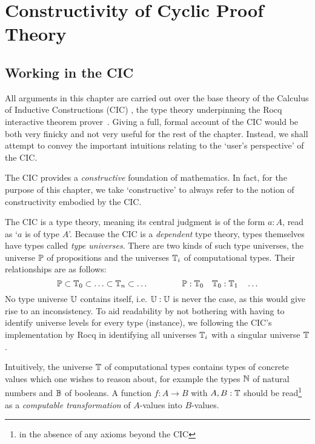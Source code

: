 
\chapter{Constructivity of Cyclic Proof Theory}
\label{chap:constructivity}

\section{Working in the CIC}
\label{sec:cic-intro}

All arguments in this chapter are carried out over the base theory of the
Calculus of Inductive Constructions (CIC) \needcite{}, the type theory
underpinning the Rocq interactive theorem prover~\needcite{}. Giving a full,
formal account of the CIC would be both very finicky and not very useful for the
rest of the chapter. Instead, we shall attempt to convey the important
intuitions relating to the `user's perspective' of the CIC.

The CIC provides a \emph{constructive} foundation of mathematics. In fact, for
the purpose of this chapter, we take `constructive' to always refer to the
notion of constructivity embodied by the CIC. 

The CIC is a type theory, meaning its central judgment is of the
form $a : A$, read as `$a$ is of type $A$'.
Because the CIC is a
\emph{dependent} type theory, types themselves have types called \emph{type
  universes}. There are two kinds of such type universes, the universe $\mathbb{P}$
of propositions and the universes $\mathbb{T}_i$ of computational types. Their
relationships are as follows:
\[
  \mathbb{P} \subset \mathbb{T}_0 \subset \ldots \subset \mathbb{T}_n \subset \ldots
  \qquad \qquad
  \mathbb{P} : \mathbb{T}_0 \quad \mathbb{T}_0 : \mathbb{T}_1 \quad \ldots
\]
No type universe $\mathbb{U}$ contains itself, i.e. $\mathbb{U} : \mathbb{U}$ is never the
case, as this would give rise to an inconsistency. To aid readability by not
bothering with having to identify universe levels for every type (instance), we
following the CIC's implementation by Rocq in identifying all universes
$\mathbb{T}_i$ with a singular universe $\mathbb{T}$.

Intuitively, the universe $\mathbb{T}$ of computational types contains types of
concrete values which one wishes to reason about, for example the types $\mathbb{N}$ of
natural numbers and $\mathbb{B}$ of booleans. A function $f : A \to B$ with $A, B :
\mathbb{T}$ should be read\footnote{\label{ft:cic}in the absence of any axioms beyond
the CIC} as a \emph{computable transformation} of $A$-values into
$B$-values.

